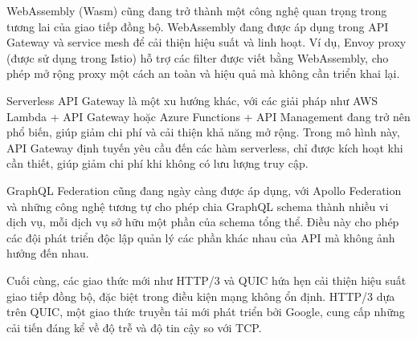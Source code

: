 WebAssembly (Wasm) cũng đang trở thành một công nghệ quan trọng trong tương lai của giao tiếp đồng bộ. WebAssembly đang được áp dụng trong API Gateway và service mesh để cải thiện hiệu suất và linh hoạt. Ví dụ, Envoy proxy (được sử dụng trong Istio) hỗ trợ các filter được viết bằng WebAssembly, cho phép mở rộng proxy một cách an toàn và hiệu quả mà không cần triển khai lại.

Serverless API Gateway là một xu hướng khác, với các giải pháp như AWS Lambda + API Gateway hoặc Azure Functions + API Management đang trở nên phổ biến, giúp giảm chi phí và cải thiện khả năng mở rộng. Trong mô hình này, API Gateway định tuyến yêu cầu đến các hàm serverless, chỉ được kích hoạt khi cần thiết, giúp giảm chi phí khi không có lưu lượng truy cập.

GraphQL Federation cũng đang ngày càng được áp dụng, với Apollo Federation và những công nghệ tương tự cho phép chia GraphQL schema thành nhiều vi dịch vụ, mỗi dịch vụ sở hữu một phần của schema tổng thể. Điều này cho phép các đội phát triển độc lập quản lý các phần khác nhau của API mà không ảnh hưởng đến nhau.

Cuối cùng, các giao thức mới như HTTP/3 và QUIC hứa hẹn cải thiện hiệu suất giao tiếp đồng bộ, đặc biệt trong điều kiện mạng không ổn định. HTTP/3 dựa trên QUIC, một giao thức truyền tải mới phát triển bởi Google, cung cấp những cải tiến đáng kể về độ trễ và độ tin cậy so với TCP.